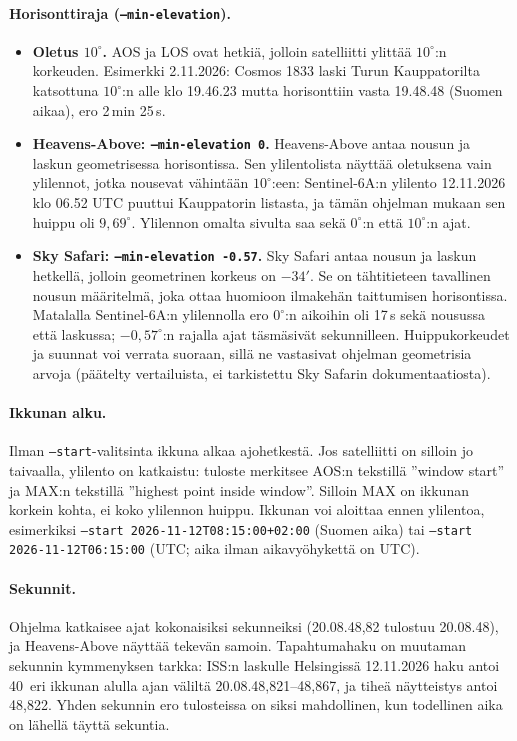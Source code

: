 \documentclass[a4paper,11pt]{article}
\newcommand{\koodi}[1]{\texttt{#1}}
\begin{document}
\paragraph{Horisonttiraja (\koodi{--min-elevation}).}
\begin{itemize}
  \item \textbf{Oletus $10^\circ$.} AOS ja LOS ovat hetkiä, jolloin satelliitti ylittää
    $10^\circ$:n korkeuden. Esimerkki 2.11.2026: Cosmos 1833 laski Turun Kauppatorilta
    katsottuna $10^\circ$:n alle klo 19.46.23 mutta horisonttiin vasta 19.48.48 (Suomen aikaa),
    ero 2\,min 25\,s.
  \item \textbf{Heavens-Above: \koodi{--min-elevation 0}.} Heavens-Above antaa nousun ja
    laskun geometrisessa horisontissa. Sen ylilentolista näyttää oletuksena vain ylilennot,
    jotka nousevat vähintään $10^\circ$:een: Sentinel-6A:n ylilento 12.11.2026 klo 06.52 UTC
    puuttui Kauppatorin listasta, ja tämän ohjelman mukaan sen huippu oli $9{,}69^\circ$.
    Ylilennon omalta sivulta saa sekä $0^\circ$:n että $10^\circ$:n ajat.
  \item \textbf{Sky Safari: \koodi{--min-elevation -0.57}.} Sky Safari antaa nousun ja laskun
    hetkellä, jolloin geometrinen korkeus on $-34'$. Se on tähtitieteen tavallinen nousun
    määritelmä, joka ottaa huomioon ilmakehän taittumisen horisontissa. Matalalla
    Sentinel-6A:n ylilennolla ero $0^\circ$:n aikoihin oli 17\,s sekä nousussa että laskussa;
    $-0{,}57^\circ$:n rajalla ajat täsmäsivät sekunnilleen. Huippukorkeudet ja suunnat voi
    verrata suoraan, sillä ne vastasivat ohjelman geometrisia arvoja (päätelty vertailuista,
    ei tarkistettu Sky Safarin dokumentaatiosta).
\end{itemize}

\paragraph{Ikkunan alku.} Ilman \koodi{--start}-valitsinta ikkuna alkaa ajohetkestä. Jos
satelliitti on silloin jo taivaalla, ylilento on katkaistu: tuloste merkitsee AOS:n tekstillä
”window start” ja MAX:n tekstillä ”highest point inside window”. Silloin MAX on ikkunan
korkein kohta, ei koko ylilennon huippu. Ikkunan voi aloittaa ennen ylilentoa, esimerkiksi
\koodi{--start 2026-11-12T08:15:00+02:00} (Suomen aika) tai \koodi{--start 2026-11-12T06:15:00}
(UTC; aika ilman aikavyöhykettä on UTC).

\paragraph{Sekunnit.} Ohjelma katkaisee ajat kokonaisiksi sekunneiksi (20.08.48,82
tulostuu 20.08.48), ja Heavens-Above näyttää tekevän samoin. Tapahtumahaku on muutaman
sekunnin kymmenyksen tarkka: ISS:n laskulle Helsingissä 12.11.2026 haku antoi 40~eri
ikkunan alulla ajan väliltä 20.08.48,821--48,867, ja tiheä näytteistys antoi 48,822. Yhden
sekunnin ero tulosteissa on siksi mahdollinen, kun todellinen aika on lähellä täyttä sekuntia.
\end{document}
